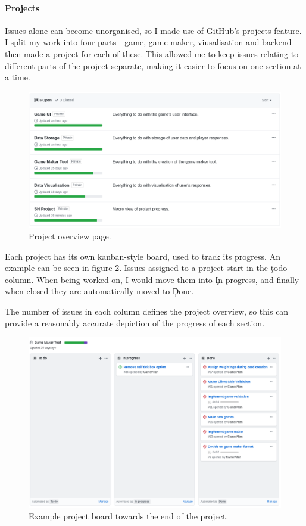 \paragraph{Projects} Issues alone can become unorganised, so I made use of GitHub's projects feature. 
I split my work into four parts - game, game maker, viusalisation and backend then made a project for each of these. 
This allowed me to keep issues relating to different parts of the project separate, making it easier to focus on one section at a time.

\begin{figure}[!h]
	\centering
	\includegraphics[width=1.0\textwidth]{./images/softeng/projects.png}
	\caption{Project overview page.}
	\label{fig:projects}
\end{figure}

Each project has its own kanban-style board, used to track its progress. 
An example can be seen in figure \ref{fig:board}. Issues assigned to a project start in the \c{todo} column. When being worked on, I would move them into \c{In progress}, and finally when closed they are automatically moved to \c{Done}.

The number of issues in each column defines the project overview, so this can provide a reasonably accurate depiction of the progress of each section.

\begin{figure}[!h]
	\centering
	\includegraphics[width=1.0\textwidth]{./images/softeng/board.png}
	\caption{Example project board towards the end of the project.}
	\label{fig:board}
\end{figure}

